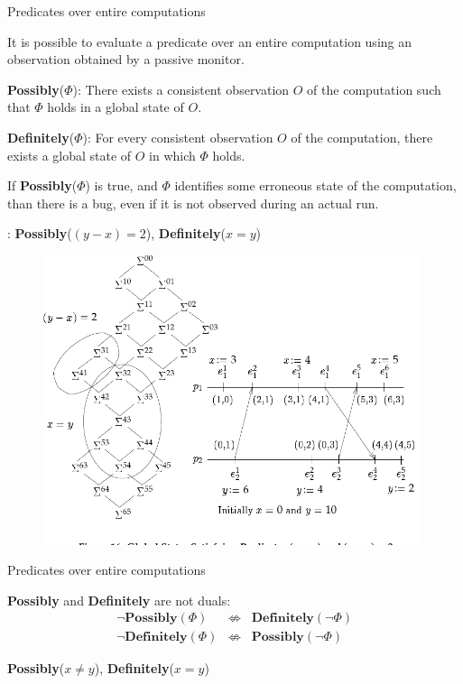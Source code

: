 \begin{frame}{Predicates over entire computations}
	
It is possible to evaluate a predicate over an entire computation using
an observation obtained by a passive monitor.

\BI
\item \alert{{\bf Possibly}($\Phi$)}: There exists a consistent observation $O$ 
  of the computation such that $\Phi$ holds in a global state of $O$.
\item \alert{{\bf Definitely}($\Phi$)}: For every consistent observation $O$ of
  the computation, there exists a global state of $O$ in which $\Phi$ holds.
\EI

\begin{example}[Debugging]
If {\bf Possibly}($\Phi$) is true, and $\Phi$ identifies some erroneous state of the
computation, than there is a bug, even if it is not observed during an actual run.
\end{example}

\end{frame}


\begin{frame}

: {\bf Possibly}($(y-x)=2$), {\bf Definitely}($x=y$)
\begin{figure} 
\includegraphics[width=11cm]{figs/03/figure-16}
\end{figure}
\end{frame}

\begin{frame}{Predicates over entire computations}

\begin{theorem}
{\bf Possibly} and {\bf Definitely} are not duals:
\begin{eqnarray*}
\neg \mathbf{Possibly}(\Phi) &\not\Leftrightarrow& \mathbf{Definitely}(\neg \Phi) \\
\neg \mathbf{Definitely}(\Phi) &\not\Leftrightarrow& \mathbf{Possibly}(\neg \Phi)
\end{eqnarray*}
\end{theorem}

\bigskip
\begin{example}
{\bf Possibly}($x \neq y$), {\bf Definitely}($x=y$)
\end{example}

\end{frame}

